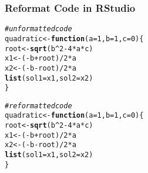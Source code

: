\documentclass[12pt]{beamer}\usepackage[]{graphicx}\usepackage[]{color}
\makeatletter
\newcommand{\hlnum}[1]{\textcolor[rgb]{0.686,0.059,0.569}{#1}}%
\newcommand{\hlcom}[1]{\textcolor[rgb]{0.678,0.584,0.686}{\textit{#1}}}%
\newcommand{\hlopt}[1]{\textcolor[rgb]{0,0,0}{#1}}%
\newcommand{\hlstd}[1]{\textcolor[rgb]{0.345,0.345,0.345}{#1}}%
\newcommand{\hlkwa}[1]{\textcolor[rgb]{0.161,0.373,0.58}{\textbf{#1}}}%
\newcommand{\hlkwb}[1]{\textcolor[rgb]{0.69,0.353,0.396}{#1}}%
\newcommand{\hlkwc}[1]{\textcolor[rgb]{0.333,0.667,0.333}{#1}}%
\newcommand{\hlkwd}[1]{\textcolor[rgb]{0.737,0.353,0.396}{\textbf{#1}}}%
\newenvironment{kframe}{%
 \def\at@end@of@kframe{}%
 \ifinner\ifhmode%
  \def\at@end@of@kframe{\end{minipage}}%
  \begin{minipage}{\columnwidth}%
 \fi\fi%
 \def\FrameCommand##1{\hskip\@totalleftmargin \hskip-\fboxsep
 \colorbox{shadecolor}{##1}\hskip-\fboxsep
     \hskip-\linewidth \hskip-\@totalleftmargin \hskip\columnwidth}%
 \MakeFramed {\advance\hsize-\width
   \@totalleftmargin\z@ \linewidth\hsize
   \@setminipage}}%
 {\par\unskip\endMakeFramed%
 \at@end@of@kframe}
\newenvironment{knitrout}{}{} %
\makeatother
\begin{document}

\begin{frame}[fragile]
\frametitle{}
\begin{center}
\end{center}
\end{frame}


\begin{frame}[fragile]
\frametitle{Reformat Code in RStudio}

\begin{knitrout}\scriptsize
{}\color{fgcolor}\begin{kframe}
\begin{alltt}
\hlcom{# unformatted code}
\hlstd{quadratic}\hlkwb{<-}\hlkwa{function}\hlstd{(}\hlkwc{a}\hlstd{=}\hlnum{1}\hlstd{,}\hlkwc{b}\hlstd{=}\hlnum{1}\hlstd{,}\hlkwc{c}\hlstd{=}\hlnum{0}\hlstd{)\{}
\hlstd{root}\hlkwb{<-}\hlkwd{sqrt}\hlstd{(b}\hlopt{^}\hlnum{2}\hlopt{-}\hlnum{4}\hlopt{*}\hlstd{a}\hlopt{*}\hlstd{c)}
\hlstd{x1}\hlkwb{<-}\hlstd{(}\hlopt{-}\hlstd{b}\hlopt{+}\hlstd{root)}\hlopt{/}\hlnum{2}\hlopt{*}\hlstd{a}
\hlstd{x2}\hlkwb{<-}\hlstd{(}\hlopt{-}\hlstd{b}\hlopt{-}\hlstd{root)}\hlopt{/}\hlnum{2}\hlopt{*}\hlstd{a}
\hlkwd{list}\hlstd{(}\hlkwc{sol1}\hlstd{=x1,}\hlkwc{sol2}\hlstd{=x2)}
\hlstd{\}}
\end{alltt}
\end{kframe}
\end{knitrout}

\pause
\begin{knitrout}\scriptsize
{}\color{fgcolor}\begin{kframe}
\begin{alltt}
\hlcom{# reformatted code}
\hlstd{quadratic} \hlkwb{<-} \hlkwa{function}\hlstd{(}\hlkwc{a} \hlstd{=} \hlnum{1}\hlstd{,}\hlkwc{b} \hlstd{=} \hlnum{1}\hlstd{,}\hlkwc{c} \hlstd{=} \hlnum{0}\hlstd{) \{}
  \hlstd{root} \hlkwb{<-} \hlkwd{sqrt}\hlstd{(b} \hlopt{^} \hlnum{2} \hlopt{-} \hlnum{4} \hlopt{*} \hlstd{a} \hlopt{*} \hlstd{c)}
  \hlstd{x1} \hlkwb{<-} \hlstd{(}\hlopt{-}\hlstd{b} \hlopt{+} \hlstd{root)} \hlopt{/} \hlnum{2} \hlopt{*} \hlstd{a}
  \hlstd{x2} \hlkwb{<-} \hlstd{(}\hlopt{-}\hlstd{b} \hlopt{-} \hlstd{root)} \hlopt{/} \hlnum{2} \hlopt{*} \hlstd{a}
  \hlkwd{list}\hlstd{(}\hlkwc{sol1} \hlstd{= x1,}\hlkwc{sol2} \hlstd{= x2)}
\hlstd{\}}
\end{alltt}
\end{kframe}
\end{knitrout}

\end{frame}
\end{document}
